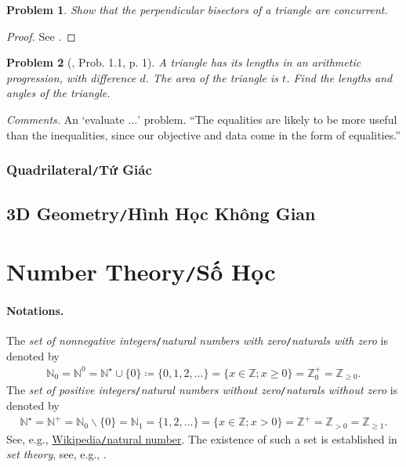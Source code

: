 \documentclass{article}
\numberwithin{equation}{section}
\newtheorem{problem}{Problem}[section]
\begin{document}
\begin{problem}
	Show that the perpendicular bisectors of a triangle are concurrent.
\end{problem}

\begin{proof}[Proof]
	See \cite[p. ix]{Tao2006}.
\end{proof}

\begin{problem}[\cite{Tao2006}, Prob. 1.1, p. 1]
	A triangle has its lengths in an arithmetic progression, with difference $d$. The area of the triangle is $t$. Find the lengths and angles of the triangle.
\end{problem}
\textit{Comments.} An `evaluate $\ldots$' problem. ``The equalities are likely to be more useful than the inequalities, since our objective and data come in the form of equalities.''

\subsubsection{Quadrilateral\texttt{/}Tứ Giác}

\subsection{3D Geometry\texttt{/}Hình Học Không Gian}

\section{Number Theory\texttt{/}Số Học}

\paragraph{Notations.} The \textit{set of nonnegative integers}\texttt{/}\textit{natural numbers with zero}\texttt{/}\textit{naturals with zero} is denoted by
\begin{align*}
	\mathbb{N}_0 = \mathbb{N}^0 = \mathbb{N}^\star\cup\{0\}\coloneqq\{0,1,2,\ldots\} = \{x\in\mathbb{Z};x\ge 0\} = \mathbb{Z}_0^+ = \mathbb{Z}_{\ge 0}.
\end{align*}
The \textit{set of positive integers}\texttt{/}\textit{natural numbers without zero}\texttt{/}\textit{naturals without zero} is denoted by
\begin{align*}
	\mathbb{N}^\star = \mathbb{N}^+ = \mathbb{N}_0\backslash\{0\} = \mathbb{N}_1 = \{1,2,\ldots\} = \{x\in\mathbb{Z};x > 0\} = \mathbb{Z}^+ = \mathbb{Z}_{> 0} = \mathbb{Z}_{\ge 1}.
\end{align*}
See, e.g., \href{https://en.wikipedia.org/wiki/Natural_number}{Wikipedia\texttt{/}natural number}. The existence of such a set is established in \textit{set theory}, see, e.g., \cite{Halmos1960, Halmos1974, Kaplansky1972, Kaplansky1977}.
\end{document}
